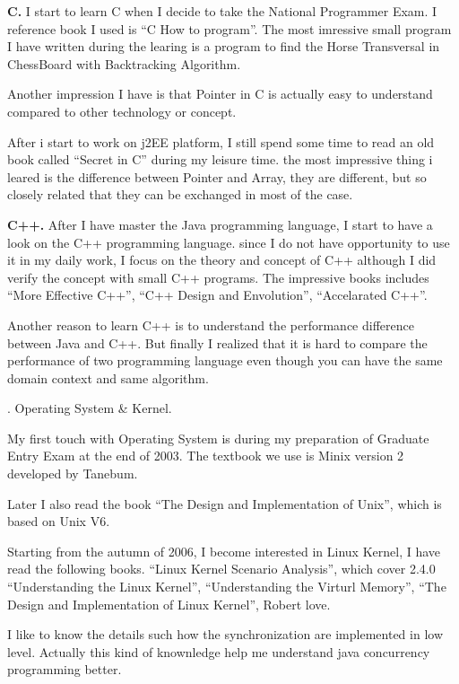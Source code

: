 \smallskip\noindent
{\bf C.} I start to learn C when I decide to take the National Programmer Exam.
I reference book I used is ``C How to program''. The most imressive small 
program I have written during the learing is a program to find the Horse 
Transversal in ChessBoard with Backtracking Algorithm.

Another impression I have is that Pointer in C is actually easy to understand compared to 
other technology or concept. 

After i start to work on j2EE platform, I still spend some time to read an old book called
``Secret in C'' during my leisure time. the most impressive thing i leared is the 
difference between Pointer and Array, they are different, but so closely related 
that they can be exchanged in most of the case.

\smallskip\noindent
{\bf C++.} After I have master the Java programming language, I start to have
a look on the C++ programming language. since I do not have opportunity to 
use it in my daily work, I focus on the theory and concept of C++ although I did
verify the concept with small C++ programs. The impressive books includes 
``More Effective C++'', ``C++ Design and Envolution'', ``Accelarated C++''.

Another reason to learn C++ is to understand the performance difference 
between Java and C++. But finally I realized that it is hard to compare 
the performance of two programming language even though you can have the 
same domain context and same algorithm.

{}. Operating System \& Kernel.

My first touch with Operating System is during my preparation of Graduate Entry
Exam at the end of 2003. The textbook we use is Minix version 2 developed by 
Tanebum.%

Later I also read the book ``The Design and Implementation of Unix'', which is
 based on Unix V6.

Starting from the autumn of 2006, I become interested in Linux Kernel, I have
read the following books.
 ``Linux Kernel Scenario Analysis'', which cover 2.4.0
 ``Understanding the Linux Kernel'',
 ``Understanding the Virturl Memory'',
 ``The Design and Implementation of Linux Kernel'', Robert love.
 
I like to know the details such how the synchronization are implemented in 
low level. Actually  this kind of knownledge help me understand java concurrency
programming better.

